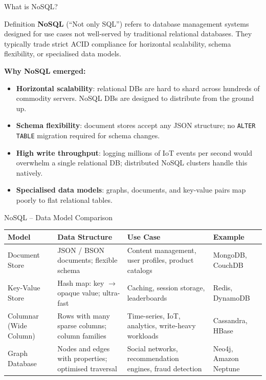 \begin{frame}{What is NoSQL?}
  \begin{block}{Definition}
    \textbf{NoSQL} (``Not only SQL'') refers to database management systems designed for
    use cases not well-served by traditional relational databases. They typically trade
    strict ACID compliance for horizontal scalability, schema flexibility, or specialised
    data models.
  \end{block}

  \textbf{Why NoSQL emerged:}
  \begin{itemize}
    \item \textbf{Horizontal scalability}: relational DBs are hard to shard across hundreds of
          commodity servers. NoSQL DBs are designed to distribute from the ground up.
    \item \textbf{Schema flexibility}: document stores accept any JSON structure; no
          \texttt{ALTER TABLE} migration required for schema changes.
    \item \textbf{High write throughput}: logging millions of IoT events per second would
          overwhelm a single relational DB; distributed NoSQL clusters handle this natively.
    \item \textbf{Specialised data models}: graphs, documents, and key-value pairs map poorly
          to flat relational tables.
  \end{itemize}
\end{frame}

\begin{frame}{NoSQL -- Data Model Comparison}
  \begin{center}
  \renewcommand{\arraystretch}{1.3}
  \begin{tabularx}{\linewidth}{@{}lXXl@{}}
    \toprule
    \textbf{Model} & \textbf{Data Structure} & \textbf{Use Case} & \textbf{Example} \\
    \midrule
    Document Store
      & JSON / BSON documents; flexible schema
      & Content management, user profiles, product catalogs
      & MongoDB, CouchDB \\[4pt]
    Key-Value Store
      & Hash map: key $\to$ opaque value; ultra-fast
      & Caching, session storage, leaderboards
      & Redis, DynamoDB \\[4pt]
    Columnar (Wide Column)
      & Rows with many sparse columns; column families
      & Time-series, IoT, analytics, write-heavy workloads
      & Cassandra, HBase \\[4pt]
    Graph Database
      & Nodes and edges with properties; optimised traversal
      & Social networks, recommendation engines, fraud detection
      & Neo4j, Amazon Neptune \\
    \bottomrule
  \end{tabularx}
  \end{center}
\end{frame}

